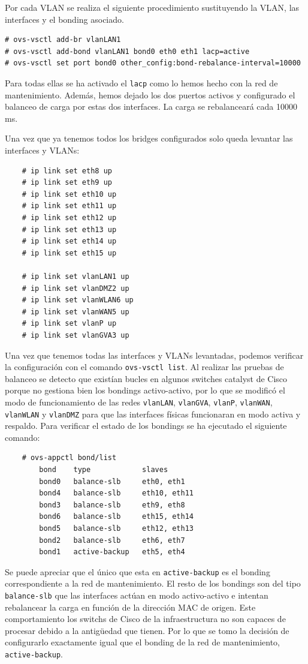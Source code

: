 \documentclass[12pt,a4paper,titlepage,twoside]{report}
\begin{document}
Por cada VLAN se realiza el siguiente procedimiento sustituyendo la VLAN, las interfaces y el bonding asociado.
\begin{verbatim}
# ovs-vsctl add-br vlanLAN1
# ovs-vsctl add-bond vlanLAN1 bond0 eth0 eth1 lacp=active 
# ovs-vsctl set port bond0 other_config:bond-rebalance-interval=10000
\end{verbatim}
Para todas ellas se ha activado el \verb|lacp| como lo hemos hecho con la red de mantenimiento. Además, hemos dejado los dos puertos activos y configurado el balanceo de carga por estas dos interfaces. La carga se rebalanceará cada 10000 ms. 
\par Una vez que ya tenemos todos los bridges configurados solo queda levantar las interfaces y VLANs:
\begin{verbatim}
    # ip link set eth8 up
    # ip link set eth9 up
    # ip link set eth10 up
    # ip link set eth11 up
    # ip link set eth12 up
    # ip link set eth13 up
    # ip link set eth14 up
    # ip link set eth15 up

    # ip link set vlanLAN1 up
    # ip link set vlanDMZ2 up
    # ip link set vlanWLAN6 up
    # ip link set vlanWAN5 up
    # ip link set vlanP up
    # ip link set vlanGVA3 up
\end{verbatim}
Una vez que tenemos todas las interfaces y VLANs levantadas, podemos verificar la configuración con el comando \verb|ovs-vsctl list|. Al realizar las pruebas de balanceo se detecto que existían bucles en algunos switches catalyst de Cisco porque no gestiona bien los bondings activo-activo, por lo que se modificó el modo de funcionamiento de las redes \verb|vlanLAN|, \verb|vlanGVA|, \verb|vlanP|, \verb|vlanWAN|, \verb|vlanWLAN| y \verb|vlanDMZ| para que las interfaces físicas funcionaran en modo activa y respaldo.  Para verificar el estado de los bondings se ha ejecutado el siguiente comando: 
\begin{verbatim}
    # ovs-appctl bond/list
        bond    type            slaves
        bond0   balance-slb     eth0, eth1
        bond4   balance-slb     eth10, eth11
        bond3   balance-slb     eth9, eth8
        bond6   balance-slb     eth15, eth14
        bond5   balance-slb     eth12, eth13
        bond2   balance-slb     eth6, eth7
        bond1   active-backup   eth5, eth4
\end{verbatim}
Se puede apreciar que el único que esta en \verb|active-backup| es el bonding correspondiente a la red de mantenimiento. El resto de los bondings son del tipo \verb|balance-slb| que las interfaces actúan en modo activo-activo e intentan rebalancear la carga en función de la dirección MAC de origen. Este comportamiento los switchs de Cisco de la infraestructura no son capaces de procesar debido a la antigüedad que tienen. Por lo que se tomo la decisión de configurarlo exactamente igual que el bonding de la red de mantenimiento, \verb|active-backup|.
\end{document}
